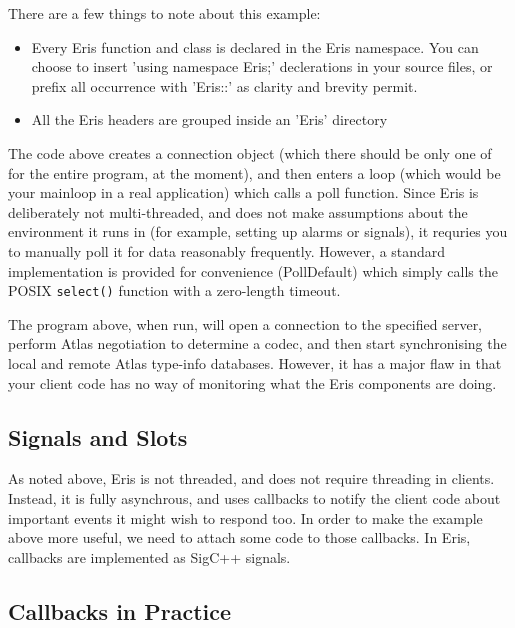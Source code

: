 \documentclass{article}
\begin{document}
There are a few things to note about this example:
\begin{itemize}
\item Every Eris function and class is declared in the Eris namespace. You can choose
to insert 'using namespace Eris;' declerations in your source files, or prefix all
occurrence with 'Eris::' as clarity and brevity permit.
\item All the Eris headers are grouped inside an 'Eris' directory 
\end{itemize}

The code above creates a connection object (which there should be only one of for the entire
program, at the moment), and then enters a loop (which would be your mainloop in a real
application) which calls a poll function. Since Eris is deliberately not multi-threaded,
and does not make assumptions about the environment it runs in (for example, setting up
alarms or signals), it requries you to manually poll it for data reasonably frequently.
However, a standard implementation is provided for convenience (PollDefault) which
simply calls the POSIX {\tt select()} function with a zero-length timeout.

The program above, when run, will open a connection to the specified server, perform
Atlas negotiation to determine a codec, and then start synchronising the local and remote
Atlas type-info databases. However, it has a major flaw in that your client code has no
way of monitoring what the Eris components are doing.

\subsection{Signals and Slots}

As noted above, Eris is not threaded, and does not require threading in clients. Instead,
it is fully asynchrous, and uses callbacks to notify the client code about important
events it might wish to respond too. In order to make the example above more useful,
we need to attach some code to those callbacks. In Eris, callbacks are implemented as
SigC++ signals.

\subsection{Callbacks in Practice}
\end{document}
